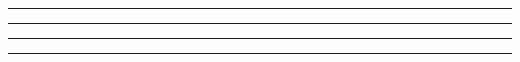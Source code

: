 
\begin{problem}{17.4}

\end{problem}

\begin{solution}


\end{solution}

\noindent\rule{7in}{1.5pt}


\begin{problem}{17.5}

\end{problem}

\begin{solution}


\end{solution}

\noindent\rule{7in}{1.5pt}


\begin{problem}{17.6}

\end{problem}

\begin{solution}


\end{solution}

\noindent\rule{7in}{1.5pt}


\begin{problem}{17.7}

\end{problem}

\begin{solution}


\end{solution}

\noindent\rule{7in}{1.5pt}


